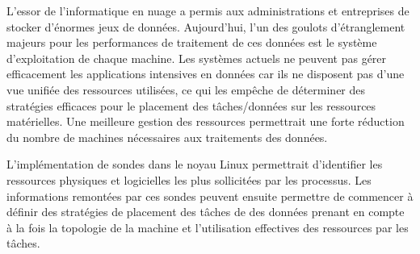 L’essor de l’informatique en nuage a permis aux administrations et entreprises
de stocker d’énormes jeux de données. Aujourd’hui, l’un des goulots
d’étranglement majeurs pour les performances de traitement de ces données est le
système d’exploitation de chaque machine. Les systèmes actuels ne peuvent pas
gérer efficacement les applications intensives en données car ils ne disposent
pas d’une vue unifiée des ressources utilisées, ce qui les empêche de déterminer
des stratégies efficaces pour le placement des tâches/données sur les ressources
matérielles. Une meilleure gestion des ressources permettrait une forte
réduction du nombre de machines nécessaires aux traitements des données.

L’implémentation de sondes dans le noyau Linux permettrait d'identifier les
ressources physiques et logicielles les plus sollicitées par les processus. Les
informations remontées par ces sondes peuvent ensuite permettre de commencer à
définir des stratégies de placement des tâches de des données prenant en compte
à la fois la topologie de la machine et l’utilisation effectives des ressources
par les tâches.
